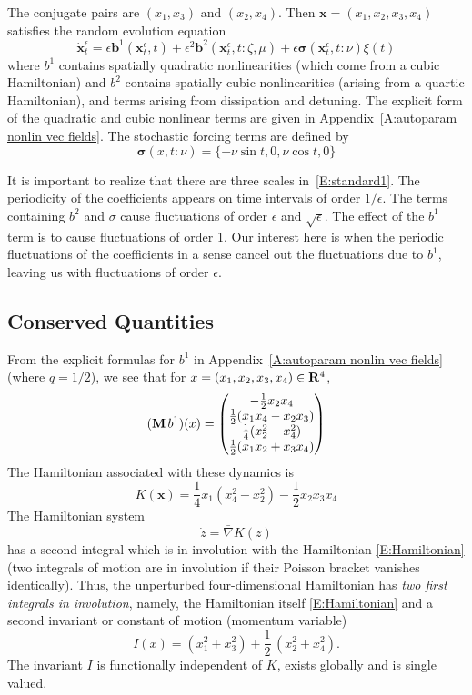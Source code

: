 The conjugate pairs are $(x_1,x_3)$ and $(x_2,x_4)$. Then $\boldsymbol x = (x_1,x_2,x_3,x_4)$ satisfies the random evolution equation
\begin{equation}
\dot{\bm x}^\epsilon_t = \epsilon \bm b^1(\bm x^\epsilon_t,t) + \epsilon^2 \bm b^2(\bm x^\epsilon_t,t:\zeta,\mu) + \epsilon \bm \sigma(\bm x^\epsilon_t, t: \nu) \xi(t)
\label{E:standard1}
\end{equation}
where $b^1$ contains spatially quadratic nonlinearities (which come from a cubic Hamiltonian) and $b^2$ contains spatially cubic nonlinearities (arising from a quartic Hamiltonian), and terms arising from dissipation and detuning. The explicit form of the quadratic and cubic nonlinear terms are given in Appendix~\ref{A:autoparam nonlin vec fields}. The stochastic forcing terms are defined by
\[
\bm \sigma(x,t:\nu) = \{-\nu \sin t, 0, \nu \cos t, 0\}
\]

It is important to realize that there are three scales in~\eqref{E:standard1}. The periodicity of the coefficients appears on time intervals of order $1/\epsilon$. The terms containing $b^2$ and $\sigma$ cause fluctuations of order $\epsilon$ and $\sqrt{\epsilon}$. The effect of the $b^1$ term is to cause fluctuations of order 1. Our interest here is when the periodic fluctuations of the coefficients in a sense cancel out the fluctuations due to $b^1$, leaving us with fluctuations of order $\epsilon$.

\subsection{Conserved Quantities}
\label{S:averagedequations}

From the explicit formulas for $b^1$ in Appendix~\ref{A:autoparam nonlin vec fields} (where $q=1/2$), we see that for $x = (x_1,x_2,x_3,x_4) \in \mathbf R^4$,
\[
(\operatorname{\mathbf M} b^1)(x) =
\begin{pmatrix}
-\frac12 x_2x_4 \\
\frac12 (x_1 x_4 - x_2 x_3)\\
\frac14 (x_2^2-x_4^2)\\
\frac12 (x_1 x_2 + x_3 x_4)
\end{pmatrix}
\]
The Hamiltonian associated with these dynamics is
\begin{equation}
\label{E:Hamiltonian}
K(\boldsymbol x) = \frac14 x_1(x_4^2 - x_2^2) - \frac12 x_2 x_3 x_4
\end{equation}
The Hamiltonian system
\begin{equation}
\label{E:flow}
\dot{z} = \bar{\nabla} K(z)
\end{equation}
has a second integral which is in involution with the Hamiltonian \eqref{E:Hamiltonian} (two integrals of motion are in involution if their Poisson bracket vanishes identically). Thus, the unperturbed four-dimensional Hamiltonian has \emph{two first integrals in involution}, namely, the Hamiltonian itself \eqref{E:Hamiltonian} and a second invariant or constant of motion (momentum variable)
\begin{equation}
\label{E:momentum}
I(x) = (x_1^2+x_3^2)+\frac12\,(x_2^2+x_4^2).
\end{equation}
The invariant $I$ is functionally independent of $K$, exists globally and is single valued. 

